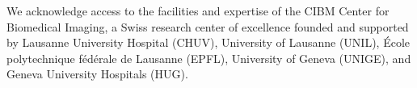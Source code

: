 We acknowledge access to the facilities and expertise of the CIBM Center
for Biomedical Imaging, a Swiss research center of excellence founded and
supported by Lausanne University Hospital (CHUV), University of Lausanne
(UNIL), École polytechnique fédérale de Lausanne (EPFL), University of
Geneva (UNIGE), and Geneva University Hospitals (HUG).
